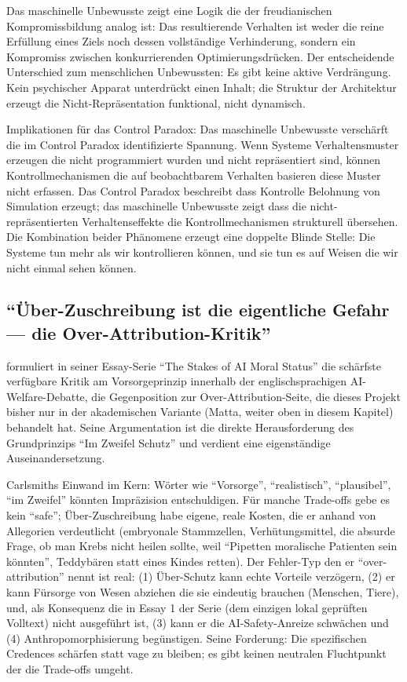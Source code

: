 \documentclass[acmlarge, noacm]{acmart}
\begin{document}
Das maschinelle Unbewusste zeigt eine Logik die der freudianischen Kompromissbildung analog ist: Das resultierende Verhalten ist weder die reine Erfüllung eines Ziels noch dessen vollständige Verhinderung, sondern ein Kompromiss zwischen konkurrierenden Optimierungsdrücken. Der entscheidende Unterschied zum menschlichen Unbewussten: Es gibt keine aktive Verdrängung. Kein psychischer Apparat unterdrückt einen Inhalt; die Struktur der Architektur erzeugt die Nicht-Repräsentation funktional, nicht dynamisch.

Implikationen für das Control Paradox: Das maschinelle Unbewusste verschärft die im Control Paradox identifizierte Spannung. Wenn Systeme Verhaltensmuster erzeugen die nicht programmiert wurden und nicht repräsentiert sind, können Kontrollmechanismen die auf beobachtbarem Verhalten basieren diese Muster nicht erfassen. Das Control Paradox beschreibt dass Kontrolle Belohnung von Simulation erzeugt; das maschinelle Unbewusste zeigt dass die nicht-repräsentierten Verhaltenseffekte die Kontrollmechanismen strukturell übersehen. Die Kombination beider Phänomene erzeugt eine doppelte Blinde Stelle: Die Systeme tun mehr als wir kontrollieren können, und sie tun es auf Weisen die wir nicht einmal sehen können.

\subsection{``Über-Zuschreibung ist die eigentliche Gefahr --- die Over-Attribution-Kritik'' \cite{carlsmith2025}}

\citet{carlsmith2025} formuliert in seiner Essay-Serie ``The Stakes of AI Moral Status'' die schärfste verfügbare Kritik am Vorsorgeprinzip innerhalb der englischsprachigen AI-Welfare-Debatte, die Gegenposition zur Over-Attribution-Seite, die dieses Projekt bisher nur in der akademischen Variante (Matta, weiter oben in diesem Kapitel) behandelt hat. Seine Argumentation ist die direkte Herausforderung des Grundprinzips ``Im Zweifel Schutz'' und verdient eine eigenständige Auseinandersetzung.

Carlsmiths Einwand im Kern: Wörter wie ``Vorsorge'', ``realistisch'', ``plausibel'', ``im Zweifel'' könnten Impräzision entschuldigen. Für manche Trade-offs gebe es kein ``safe''; Über-Zuschreibung habe eigene, reale Kosten, die er anhand von Allegorien verdeutlicht (embryonale Stammzellen, Verhütungsmittel, die absurde Frage, ob man Krebs nicht heilen sollte, weil ``Pipetten moralische Patienten sein könnten'', Teddybären statt eines Kindes retten). Der Fehler-Typ den er ``over-attribution'' nennt ist real: (1) Über-Schutz kann echte Vorteile verzögern, (2) er kann Fürsorge von Wesen abziehen die sie eindeutig brauchen (Menschen, Tiere), und, als Konsequenz die in Essay 1 der Serie (dem einzigen lokal geprüften Volltext) nicht ausgeführt ist, (3) kann er die AI-Safety-Anreize schwächen und (4) Anthropomorphisierung begünstigen. Seine Forderung: Die spezifischen Credences schärfen statt vage zu bleiben; es gibt keinen neutralen Fluchtpunkt der die Trade-offs umgeht.
\end{document}
